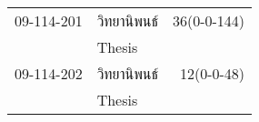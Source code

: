 \begin{longtable}{p{}p{}r{}}
09-114-201 & วิทยานิพนธ์ & 36(0-0-144)\\
 & Thesis & \\[3mm]
09-114-202 & วิทยานิพนธ์ & 12(0-0-48)\\
 & Thesis & \\[3mm]
\end{longtable}
